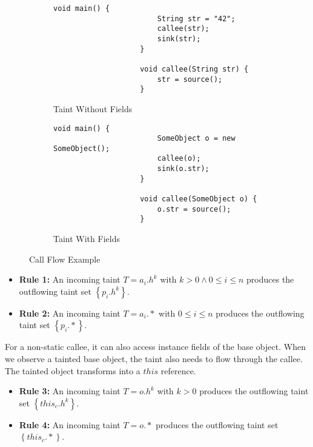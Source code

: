 \documentclass[../draft.tex]{subfiles}
\begin{document}
    \begin{figure}[t]
        \centering
        \begin{subfigure}[b]{0.45\textwidth}
            \centering
            \begin{adjustbox}{max width=\columnwidth}
                \begin{lstlisting}[gobble=20]
                    void main() {
                        String str = "42";
                        callee(str);
                        sink(str);
                    }
            
                    void callee(String str) {
                        str = source();
                    }
                \end{lstlisting}
            \end{adjustbox}
            \caption{Taint Without Fields}
        \end{subfigure}
        \qquad
        \begin{subfigure}[b]{0.45\textwidth}
            \centering
            \begin{adjustbox}{max width=\columnwidth}
                \begin{lstlisting}[gobble=20]
                    void main() {
                        SomeObject o = new SomeObject();
                        callee(o);
                        sink(o.str);
                    }
            
                    void callee(SomeObject o) {
                        o.str = source();
                    }
                \end{lstlisting}
            \end{adjustbox}
            \caption{Taint With Fields}
        \end{subfigure}
        \caption{Call Flow Example}
        \label{lst:primret} 
    \end{figure}

    \begin{itemize}
        \item[] \textbf{Rule 1:} An incoming taint $T=a_i.h^k$ with $k > 0 \land 0 \leq i \leq n$ produces the outflowing taint set $\left\{p_i.h^k\right\}$.
        \item[] \textbf{Rule 2:} An incoming taint $T=a_i.*$ with $0 \leq i \leq n$ produces the outflowing taint set $\left\{p_i.*\right\}$.
    \end{itemize}

    For a non-static callee, it can also access instance fields of the base object. When we observe a tainted base object, the taint also needs to flow through the callee. The tainted object transforms into a $\mathit{this}$ reference.
    \begin{itemize}
        \item[] \textbf{Rule 3:} An incoming taint $T=o.h^k$ with $k > 0$ produces the outflowing taint set $\left\{\mathit{this}_c.h^k\right\}$. 
        \item[] \textbf{Rule 4:} An incoming taint $T=o.*$ produces the outflowing taint set $\left\{\mathit{this}_c.*\right\}$.
    \end{itemize}
    
\end{document}
